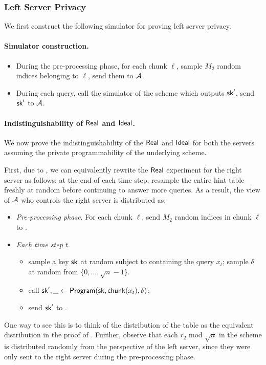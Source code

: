 \subsubsection{Left Server Privacy}
We first construct 
the following simulator for proving left server privacy.

\paragraph{Simulator construction.}
\begin{itemize}[leftmargin=5mm]
\item  
During the pre-processing phase, 
for each chunk $\ell$, sample $M_2$ 
random indices belonging to $\ell$, send them to $\mathcal{A}$.
\item 
During each query, 
call the simulator of the \ppps scheme which outputs $\mathsf{sk}'$, 
send $\mathsf{sk}'$ to $\mathcal{A}$. 
\end{itemize}

\paragraph{Indistinguishability of ${\sf Real}$ and ${\sf Ideal}$.}
We now prove the indistinguishability of the ${\sf Real}$ and
${\sf Ideal}$ for both the servers
assuming the 
private programmability of the underlying \ppps scheme.

First, due to , 
we can equivalently rewrite the ${\sf Real}$ experiment 
for the right server as follows:
at the end of each time step, resample the entire hint table
freshly at random before continuing to answer more queries.
As a result, 
the view of $\mathcal{A}$ who controls the right server is 
distributed as: 
\begin{itemize}[leftmargin=5mm]
\item {\it Pre-processing phase}.
For each chunk $\ell$, send $M_2$ random indices
in chunk $\ell$ to \algA.
\item {\it Each time step $t$}.
\begin{itemize}[leftmargin=5mm]
\item 
sample a \ppps key $\mathsf{sk}$
 at random subject to containing the query $x_t$;
sample $\delta$ at random
from $\{0, \ldots, \sqrt{n}-1\}$.
\item 
call $\mathsf{sk}', \_ \leftarrow {\sf Program}(\mathsf{sk}, \mathsf{chunk}(x_t), \delta)$; 
\item 
send $\mathsf{sk}'$ to \algA.
\end{itemize}
\end{itemize}
One way to see this is to think of the distribution of the table
as the equivalent distribution
in the proof of . 
Further, observe that each $r_2\text{ mod }\sqrt{n}$ in the scheme 
is distributed randomly from the perspective
of the left server,  
since they 
were only sent to the 
right server during the pre-processing phase.

